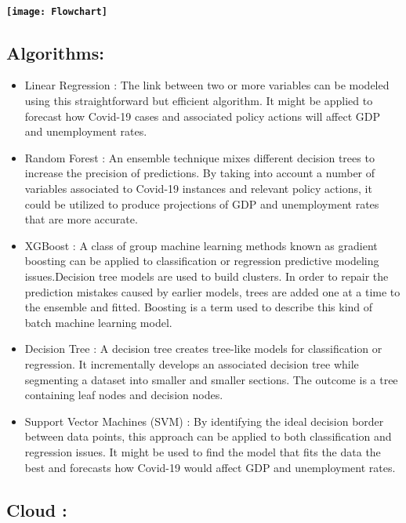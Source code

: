 \documentclass{article}
\begin{document}
\paragraph{
\texttt{[image: Flowchart]}
}
\subsection{Algorithms: }
\begin{itemize}
    \item Linear Regression : The link between two or more variables can be modeled using this straightforward but efficient algorithm. It might be applied to forecast how Covid-19 cases and associated policy actions will affect GDP and unemployment rates.
    \item Random Forest : An ensemble technique mixes different decision trees to increase the precision of predictions. By taking into account a number of variables associated to Covid-19 instances and relevant policy actions, it could be utilized to produce projections of GDP and unemployment rates that are more accurate.
    \item XGBoost : A class of group machine learning methods known as gradient boosting can be applied to classification or regression predictive modeling issues.Decision tree models are used to build clusters. In order to repair the prediction mistakes caused by earlier models, trees are added one at a time to the ensemble and fitted. Boosting is a term used to describe this kind of batch machine learning model.
    \item Decision Tree : A decision tree creates tree-like models for classification or regression. It incrementally develops an associated decision tree while segmenting a dataset into smaller and smaller sections. The outcome is a tree containing leaf nodes and decision nodes.
    \item Support Vector Machines (SVM) : By identifying the ideal decision border between data points, this approach can be applied to both classification and regression issues. It might be used to find the model that fits the data the best and forecasts how Covid-19 would affect GDP and unemployment rates.
\end{itemize}

\subsection{Cloud : }
\end{document}
